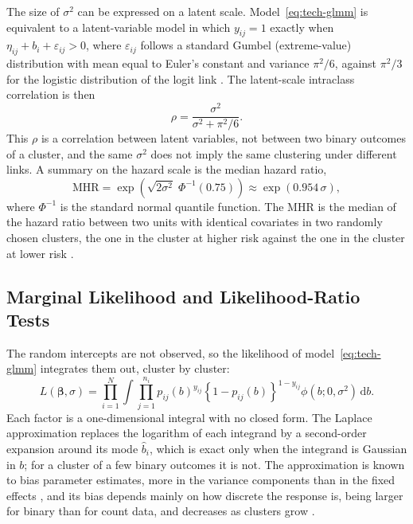 The size of $\sigma^2$ can be expressed on a latent scale.
Model~\eqref{eq:tech-glmm} is equivalent to a latent-variable model in which $y_{ij} = 1$ exactly when $\eta_{ij} + b_i + \varepsilon_{ij} > 0$, where $\varepsilon_{ij}$ follows a standard Gumbel (extreme-value) distribution with mean equal to Euler's constant and variance $\pi^2/6$, against $\pi^2/3$ for the logistic distribution of the logit link \cite{statacorp2025mecloglog, nakagawa2017r2}.
The latent-scale intraclass correlation is then
\begin{equation}
  \rho = \frac{\sigma^2}{\sigma^2 + \pi^2/6} .
  \label{eq:tech-icc}
\end{equation}
This $\rho$ is a correlation between latent variables, not between two binary outcomes of a cluster, and the same $\sigma^2$ does not imply the same clustering under different links.
A summary on the hazard scale is the median hazard ratio,
\begin{equation}
  \mathrm{MHR} = \exp\!\left(\sqrt{2\sigma^2}\;\Phi^{-1}(0.75)\right) \approx \exp(0.954\,\sigma),
  \label{eq:tech-mhr}
\end{equation}
where $\Phi^{-1}$ is the standard normal quantile function.
The MHR is the median of the hazard ratio between two units with identical covariates in two randomly chosen clusters, the one in the cluster at higher risk against the one in the cluster at lower risk \cite{austin2017mhr}.

\subsection{Marginal Likelihood and Likelihood-Ratio Tests}
\label{sec:tech-glmm-likelihood}

The random intercepts are not observed, so the likelihood of model~\eqref{eq:tech-glmm} integrates them out, cluster by cluster:
\begin{equation}
  L(\boldsymbol{\beta}, \sigma) = \prod_{i=1}^{N} \int \prod_{j=1}^{n_i} p_{ij}(b)^{y_{ij}} \left\{1 - p_{ij}(b)\right\}^{1 - y_{ij}} \phi(b; 0, \sigma^2)\,\mathrm{d}b .
  \label{eq:tech-glmm-lik}
\end{equation}
Each factor is a one-dimensional integral with no closed form.
The Laplace approximation replaces the logarithm of each integrand by a second-order expansion around its mode $\hat{b}_i$, which is exact only when the integrand is Gaussian in $b$; for a cluster of a few binary outcomes it is not.
The approximation is known to bias parameter estimates, more in the variance components than in the fixed effects \cite{statacorp2025mecloglog}, and its bias depends mainly on how discrete the response is, being larger for binary than for count data, and decreases as clusters grow \cite{joe2008laplace}.

